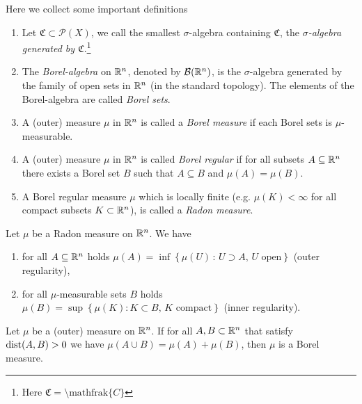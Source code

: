 \begin{definition} Here we collect some important definitions 
\begin{enumerate}[(1)]
\item Let $\mathfrak{C} \subset \mathcal{P}(X)$, we call the smallest
$\sigma$-algebra containing $\mathfrak{C}$, the \emph{$\sigma$-algebra generated by
$\mathfrak{C}$}.\footnote{Here $\mathfrak{C}=\setminus\text{mathfrak}\{C\}$} 
\item The \emph{Borel-algebra} on $\mathbb{R}^n$, denoted by $\mathcal{B}(\mathbb{R}^n)$, is the
$\sigma$-algebra generated by the family of open sets in $\mathbb{R}^n$ (in the standard
topology). The elements of the Borel-algebra are called \emph{Borel sets}.
\item A (outer) measure $\mu$ in $\mathbb{R}^n$ is called a \emph{Borel measure} if each
Borel sets is $\mu$-measurable.
\item A (outer) measure $\mu$ in $\mathbb{R}^n$ is called \emph{Borel regular} if for
all subsets $A \subseteq \mathbb{R}^n$ there exists a Borel set $B$ such that $A \subseteq
B$ and $\mu(A) = \mu(B)$.
\item A Borel regular measure $\mu$ which is locally finite (e.g. $\mu(K) <
\infty$ for all compact subsets $K \subset \mathbb{R}^n$), is called a \emph{Radon measure}.
\end{enumerate}
\end{definition}

\begin{theorem}
Let $\mu$ be a Radon measure on $\mathbb{R}^n$. We have
\begin{enumerate}[(1)]
\item  for all $A \subseteq \mathbb{R}^n$ holds $\mu(A) = \inf\left\{ \mu(U) \,:\,
U \supset A,\, U \text{ open}\right\}$ \hfill (outer regularity),
\item for all $\mu$-measurable sets $B$ holds 
$\mu(B) = \sup \left\{ \mu (K): K \subset B,\, K \text{ compact}\right\}$ \hfill
(inner regularity).
\end{enumerate}
\end{theorem}

\begin{theorem}
Let $\mu$ be a (outer) measure on $\mathbb{R}^n$. If for all $A,B \subset \mathbb{R}^n$ that
satisfy $\operatorname{dist}(A,B) > 0$ we have $\mu(A \cup B) = \mu(A) + \mu(B)$, then $\mu$
is a Borel measure.
\end{theorem}

